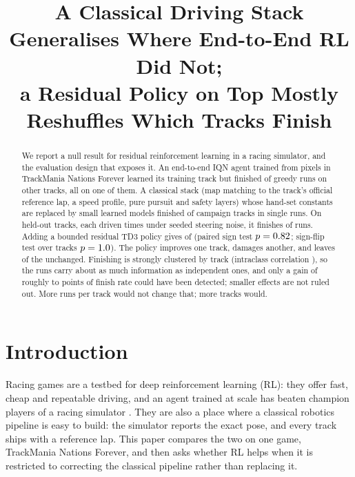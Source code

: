 \documentclass[conference]{IEEEtran}
\begin{document}
\title{A Classical Driving Stack Generalises Where End-to-End RL Did Not;\\
a Residual Policy on Top Mostly Reshuffles Which Tracks Finish}

\author{
}

\maketitle

\begin{abstract}
We report a null result for residual reinforcement learning in a racing simulator, and the evaluation
design that exposes it. An end-to-end IQN agent trained from pixels in TrackMania Nations Forever learned its
training track but finished \IQNLastOther of \IQNOtherRuns greedy runs on \IQNOtherMaps other tracks, all on one of them.
A classical stack (map matching to the track's official reference lap, a speed profile, pure pursuit and
safety layers) whose hand-set constants are replaced by small learned models finished \CampaignFin of \CampaignMaps campaign tracks in single runs. On
\NTest held-out tracks, each driven \RunsPerMap times under seeded steering noise, it finishes \BaseFin of
\TestRuns runs. Adding a bounded residual TD3 policy gives \VnineFin of \TestRuns (paired sign test
$p=0.82$; sign-flip test over tracks $p=1.0$). The policy improves one track, damages another,
and leaves \UnchangedMaps of the \NTest unchanged. Finishing is strongly clustered by track
(intraclass correlation \ICC), so the
\TestRuns runs carry about as much information as \ESS independent ones, and only a gain of roughly
\PowerLoGain to \PowerHiGain points of finish rate could have been detected; smaller effects are not ruled
out. More runs per track would not change that; more tracks would.
\end{abstract}

\section{Introduction}

Racing games are a testbed for deep reinforcement learning (RL): they offer fast, cheap and repeatable
driving, and an agent trained at scale has beaten champion players of a racing simulator \cite{wurman2022gtsophy}. They are also a place where a classical robotics pipeline is
easy to build: the simulator reports the exact pose, and every track ships with a reference lap. This paper
compares the two on one game, TrackMania Nations Forever, and then asks whether RL helps when it is restricted
to correcting the classical pipeline rather than replacing it.
\end{document}
